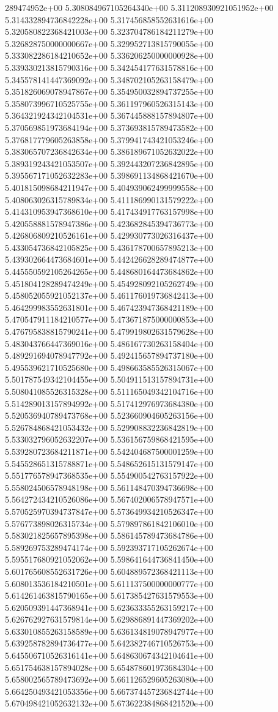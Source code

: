289474952e+00	5.308084967105264340e+00	5.311208930921051952e+00	5.314332894736842228e+00	5.317456858552631616e+00	5.320580822368421003e+00	5.323704786184211279e+00	5.326828750000000667e+00	5.329952713815790055e+00	5.333082286184210652e+00	5.336206250000000928e+00	5.339330213815790316e+00	5.342454177631578816e+00	5.345578141447369092e+00	5.348702105263158479e+00	5.351826069078947867e+00	5.354950032894737255e+00	5.358073996710525755e+00	5.361197960526315143e+00	5.364321924342104531e+00	5.367445888157894807e+00	5.370569851973684194e+00	5.373693815789473582e+00	5.376817779605263858e+00	5.379941743421053246e+00	5.383065707236842634e+00	5.386189671052632022e+00	5.389319243421053507e+00	5.392443207236842895e+00	5.395567171052632283e+00	5.398691134868421670e+00	5.401815098684211947e+00	5.404939062499999558e+00	5.408063026315789834e+00	5.411186990131579222e+00	5.414310953947368610e+00	5.417434917763157998e+00	5.420558881578947386e+00	5.423682845394736773e+00	5.426806809210526161e+00	5.429930773026316437e+00	5.433054736842105825e+00	5.436178700657895213e+00	5.439302664473684601e+00	5.442426628289474877e+00	5.445550592105264265e+00	5.448680164473684862e+00	5.451804128289474249e+00	5.454928092105262749e+00	5.458052055921052137e+00	5.461176019736842413e+00	5.464299983552631801e+00	5.467423947368421189e+00	5.470547911184210577e+00	5.473671875000000853e+00	5.476795838815790241e+00	5.479919802631579628e+00	5.483043766447369016e+00	5.486167730263158404e+00	5.489291694078947792e+00	5.492415657894737180e+00	5.495539621710525680e+00	5.498663585526315067e+00	5.501787549342104455e+00	5.504911513157894731e+00	5.508041085526315328e+00	5.511165049342104716e+00	5.514289013157894992e+00	5.517412976973684380e+00	5.520536940789473768e+00	5.523660904605263156e+00	5.526784868421053432e+00	5.529908832236842819e+00	5.533032796052632207e+00	5.536156759868421595e+00	5.539280723684211871e+00	5.542404687500001259e+00	5.545528651315788871e+00	5.548652615131579147e+00	5.551776578947368535e+00	5.554900542763157922e+00	5.558024506578948198e+00	5.561148470394736698e+00	5.564272434210526086e+00	5.567402006578947571e+00	5.570525970394737847e+00	5.573649934210526347e+00	5.576773898026315734e+00	5.579897861842106010e+00	5.583021825657895398e+00	5.586145789473684786e+00	5.589269753289474174e+00	5.592393717105262674e+00	5.595517680921052062e+00	5.598641644736841450e+00	5.601765608552631726e+00	5.604889572368421113e+00	5.608013536184210501e+00	5.611137500000000777e+00	5.614261463815790165e+00	5.617385427631579553e+00	5.620509391447368941e+00	5.623633355263159217e+00	5.626762927631579814e+00	5.629886891447369202e+00	5.633010855263158589e+00	5.636134819078947977e+00	5.639258782894736477e+00	5.642382746710526753e+00	5.645506710526316141e+00	5.648630674342104641e+00	5.651754638157894028e+00	5.654878601973684304e+00	5.658002565789473692e+00	5.661126529605263080e+00	5.664250493421053356e+00	5.667374457236842744e+00	5.670498421052632132e+00	5.673622384868421520e+00
